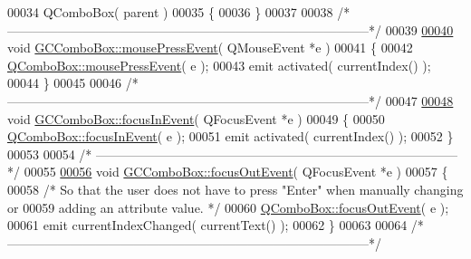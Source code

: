 \begin{DoxyCode}
00034   QComboBox( parent )
00035 \{
00036 \}
00037 
00038 \textcolor{comment}{/*
      --------------------------------------------------------------------------------------*/}
00039 
\hypertarget{gccombobox_8cpp_source_l00040}{}\hyperlink{class_g_c_combo_box_a20358fcd497e5d179c3513d6829a1d84}{00040} \textcolor{keywordtype}{void} \hyperlink{class_g_c_combo_box_a20358fcd497e5d179c3513d6829a1d84}{GCComboBox::mousePressEvent}( QMouseEvent *e )
00041 \{
00042   \hyperlink{class_g_c_combo_box_a20358fcd497e5d179c3513d6829a1d84}{QComboBox::mousePressEvent}( e );
00043   emit activated( currentIndex() );
00044 \}
00045 
00046 \textcolor{comment}{/*
      --------------------------------------------------------------------------------------*/}
00047 
\hypertarget{gccombobox_8cpp_source_l00048}{}\hyperlink{class_g_c_combo_box_aeb5633813d3c92ee6b7759d2ae5f942d}{00048} \textcolor{keywordtype}{void} \hyperlink{class_g_c_combo_box_aeb5633813d3c92ee6b7759d2ae5f942d}{GCComboBox::focusInEvent}( QFocusEvent *e )
00049 \{
00050   \hyperlink{class_g_c_combo_box_aeb5633813d3c92ee6b7759d2ae5f942d}{QComboBox::focusInEvent}( e );
00051   emit activated( currentIndex() );
00052 \}
00053 
00054 \textcolor{comment}{/*
      --------------------------------------------------------------------------------------*/}
00055 
\hypertarget{gccombobox_8cpp_source_l00056}{}\hyperlink{class_g_c_combo_box_ab3aff530b6cac02b9eeda39b83a16411}{00056} \textcolor{keywordtype}{void} \hyperlink{class_g_c_combo_box_ab3aff530b6cac02b9eeda39b83a16411}{GCComboBox::focusOutEvent}( QFocusEvent *e )
00057 \{
00058   \textcolor{comment}{/* So that the user does not have to press "Enter" when manually changing or}
00059 \textcolor{comment}{    adding an attribute value. */}
00060   \hyperlink{class_g_c_combo_box_ab3aff530b6cac02b9eeda39b83a16411}{QComboBox::focusOutEvent}( e );
00061   emit currentIndexChanged( currentText() );
00062 \}
00063 
00064 \textcolor{comment}{/*
      --------------------------------------------------------------------------------------*/}
\end{DoxyCode}
